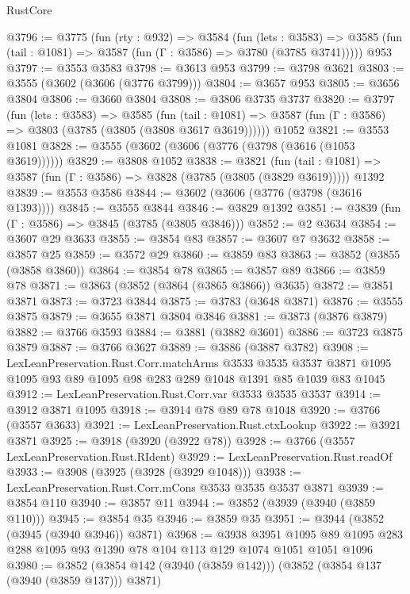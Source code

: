 \begin{lexlean}{RustCore}
\begin{coremodule}
@3796 := @3775
    (fun (rty : @932) =>
    @3584
      (fun (lets : @3583) =>
      @3585 (fun (tail : @1081) => @3587 (fun (Γ : @3586) => @3780 (@3785 @3741)))))
    @953
@3797 := @3553 @3583
@3798 := @3613 @953
@3799 := @3798 @3621
@3803 := @3555 (@3602 (@3606 (@3776 @3799)))
@3804 := @3657 @953
@3805 := @3656 @3804
@3806 := @3660 @3804
@3808 := @3806 @3735 @3737
@3820 := @3797
    (fun (lets : @3583) =>
    @3585
      (fun (tail : @1081) => @3587 (fun (Γ : @3586) => @3803 (@3785 (@3805 (@3808 @3617 @3619))))))
    @1052
@3821 := @3553 @1081
@3828 := @3555 (@3602 (@3606 (@3776 (@3798 (@3616 (@1053 @3619))))))
@3829 := @3808 @1052
@3838 := @3821
    (fun (tail : @1081) => @3587 (fun (Γ : @3586) => @3828 (@3785 (@3805 (@3829 @3619)))))
    @1392
@3839 := @3553 @3586
@3844 := @3602 (@3606 (@3776 (@3798 (@3616 @1393))))
@3845 := @3555 @3844
@3846 := @3829 @1392
@3851 := @3839 (fun (Γ : @3586) => @3845 (@3785 (@3805 @3846)))
@3852 := @2 @3634
@3854 := @3607 @29 @3633
@3855 := @3854 @83
@3857 := @3607 @7 @3632
@3858 := @3857 @25
@3859 := @3572 @29
@3860 := @3859 @83
@3863 := @3852 (@3855 (@3858 @3860))
@3864 := @3854 @78
@3865 := @3857 @89
@3866 := @3859 @78
@3871 := @3863 (@3852 (@3864 (@3865 @3866)) @3635)
@3872 := @3851 @3871
@3873 := @3723 @3844
@3875 := @3783 (@3648 @3871)
@3876 := @3555 @3875
@3879 := @3655 @3871 @3804 @3846
@3881 := @3873 (@3876 @3879)
@3882 := @3766 @3593
@3884 := @3881 (@3882 @3601)
@3886 := @3723 @3875 @3879
@3887 := @3766 @3627
@3889 := @3886 (@3887 @3782)
@3908 := LexLeanPreservation.Rust.Corr.matchArms
    @3533
    @3535
    @3537
    @3871
    @1095
    @1095
    @93
    @89
    @1095
    @98
    @283
    @289
    @1048
    @1391
    @85
    @1039
    @83
    @1045
@3912 := LexLeanPreservation.Rust.Corr.var @3533 @3535 @3537
@3914 := @3912 @3871 @1095
@3918 := @3914 @78 @89 @78 @1048
@3920 := @3766 (@3557 @3633)
@3921 := LexLeanPreservation.Rust.ctxLookup
@3922 := @3921 @3871
@3925 := @3918 (@3920 (@3922 @78))
@3928 := @3766 (@3557 LexLeanPreservation.Rust.RIdent)
@3929 := LexLeanPreservation.Rust.readOf
@3933 := @3908 (@3925 (@3928 (@3929 @1048)))
@3938 := LexLeanPreservation.Rust.Corr.mCons @3533 @3535 @3537 @3871
@3939 := @3854 @110
@3940 := @3857 @11
@3944 := @3852 (@3939 (@3940 (@3859 @110)))
@3945 := @3854 @35
@3946 := @3859 @35
@3951 := @3944 (@3852 (@3945 (@3940 @3946)) @3871)
@3968 := @3938
    @3951
    @1095
    @89
    @1095
    @283
    @288
    @1095
    @93
    @1390
    @78
    @104
    @113
    @129
    @1074
    @1051
    @1051
    @1096
@3980 := @3852 (@3854 @142 (@3940 (@3859 @142))) (@3852 (@3854 @137 (@3940 (@3859 @137))) @3871)

\end{coremodule}
\end{lexlean}
